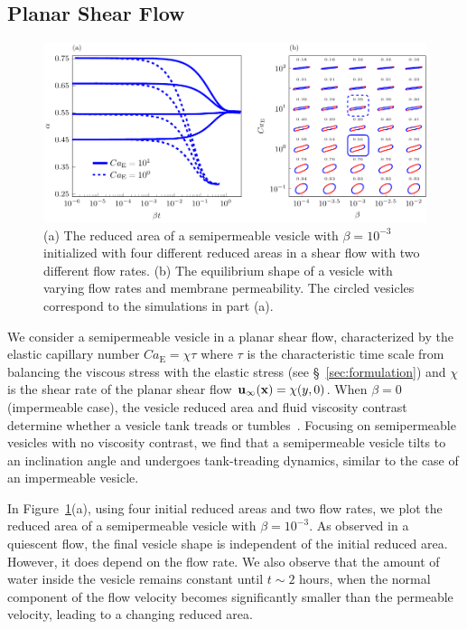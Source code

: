 \documentclass[prb,preprint,showpacs,preprintnumbers,amsmath,amssymb,longbibliography]{revtex4-1}
\newif\ifTikz
\begin{document}
\subsection{Planar Shear Flow}
\begin{figure}[htp]
  \centering
  \ifTikz
  
  \else
  \includegraphics{figures/shearComposite.pdf}
  \fi
  \caption{\label{fig:shearComposite} (a) The reduced area of a
  semipermeable vesicle with $\beta = 10^{-3}$ initialized with four
  different reduced areas in a shear flow with two different flow rates.
  (b) The equilibrium shape of a vesicle with varying flow rates and
  membrane permeability. The circled vesicles correspond to the
  simulations in part (a).}
\end{figure}

We consider a semipermeable vesicle in a planar shear flow,
characterized by the elastic capillary number $Ca_\mathrm{E}=\chi\tau$ where $\tau$ is the characteristic time scale from balancing the viscous stress with the elastic stress
(see \S~\ref{sec:formulation}) and $\chi$ is the shear rate of the planar
shear flow $\mathbf{u}_{\infty}(\mathbf{x}) = \chi (y,0)$.  When $\beta=0$
(impermeable case), the vesicle reduced area and fluid viscosity
contrast determine whether a vesicle tank treads or
tumbles~\cite{fin-lam-sei-gom2008, kra-win-sei-lip1996}. Focusing on
semipermeable vesicles with no viscosity contrast, we find that a
semipermeable vesicle tilts to an inclination angle and undergoes
tank-treading dynamics, similar to the case of an impermeable vesicle.

In Figure~\ref{fig:shearComposite}(a), using four initial reduced areas
and two flow rates, we plot the reduced area of a semipermeable vesicle
with $\beta = 10^{-3}$. As observed in a quiescent flow, the final
vesicle shape is independent of the initial reduced area. However, it
does depend on the flow rate. We also observe that the amount of water
inside the vesicle remains constant until $t\sim 2$ hours, when the
normal component of the flow velocity becomes significantly smaller than
the permeable velocity, leading to a changing reduced area.
\end{document}
